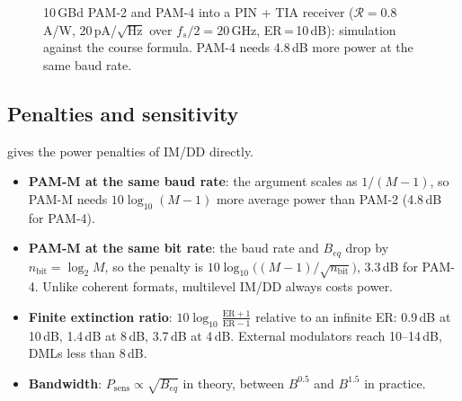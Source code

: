 \begin{figure}[htbp]
\centering
{}
\caption{10\,GBd PAM-2 and PAM-4 into a PIN + TIA receiver ($\mathcal R=0.8$\,A/W, 20\,pA/$\sqrt{\mathrm{Hz}}$ over
$f_s/2=20$\,GHz, ER\,=\,10\,dB): simulation against the course formula. PAM-4 needs 4.8\,dB more
power at the same baud rate.}
\label{fig:pam-imdd}
\end{figure}

\subsection{Penalties and sensitivity}\label{sec:imdd-penalties}
 gives the power penalties of IM/DD directly.
\begin{itemize}
  \item \textbf{PAM-M at the same baud rate}: the argument scales as $1/(M-1)$, so PAM-M needs
  $10\log_{10}(M-1)$ more average power than PAM-2 (4.8\,dB for PAM-4).
  \item \textbf{PAM-M at the same bit rate}: the baud rate and $B_{eq}$ drop by $n_{\mathrm{bit}}=\log_2M$, so the
  penalty is $10\log_{10}\big((M-1)/\sqrt{n_{\mathrm{bit}}}\big)$, 3.3\,dB for PAM-4. Unlike coherent formats,
  multilevel IM/DD always costs power.
  \item \textbf{Finite extinction ratio}: $10\log_{10}\frac{\mathrm{ER}+1}{\mathrm{ER}-1}$ relative to an infinite ER: 0.9\,dB
  at 10\,dB, 1.4\,dB at 8\,dB, 3.7\,dB at 4\,dB. External modulators reach 10--14\,dB, DMLs less than 8\,dB.
  \item \textbf{Bandwidth}: $P_{\mathrm{sens}}\propto\sqrt{B_{eq}}$ in theory, between $B^{0.5}$ and $B^{1.5}$ in practice.
\end{itemize}

